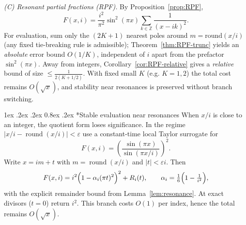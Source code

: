 \documentclass[11pt,a4paper]{amsart}
\makeatletter
\renewcommand\paragraph{\@startsection{paragraph}{4}{\z@}%
  {1ex \@plus .2ex \@minus .2ex}%
  {0.8ex \@plus .2ex}%
  {\normalfont\bfseries}}
\theoremstyle{plain}
\theoremstyle{definition}
\theoremstyle{remark}
\makeatother
\begin{document}
\smallskip
\noindent\textit{(C) Resonant partial fractions (RPF).}
By Proposition~\ref{prop:RPF},
\[
F(x,i)=\frac{i^{2}}{\pi^{2}}\sin^{2}(\pi x)\sum_{k\in\mathbb{Z}}\frac{1}{(x-ik)^{2}}.
\]
For evaluation, sum only the $(2K{+}1)$ nearest poles around $m=\mathrm{round}(x/i)$ (any fixed tie-breaking rule is admissible); Theorem~\ref{thm:RPF-trunc} yields an \emph{absolute} error bound $O(1/K)$, independent of $i$ apart from the prefactor $\sin^{2}(\pi x)$.  
Away from integers, Corollary~\ref{cor:RPF-relative} gives a \emph{relative} bound of size $\le \frac{1}{2(K+1/2)}$. With fixed small $K$ (e.g. $K=1,2$) the total cost remains $O(\sqrt{x})$, and stability near resonances is preserved without branch switching.

\paragraph*{Stable evaluation near resonances}
When $x/i$ is close to an integer, the quotient form loses significance. In the regime $\bigl|x/i-\operatorname{round}(x/i)\bigr|<\varepsilon$ use a constant-time local Taylor surrogate for 
\[
F(x,i)=\left(\frac{\sin(\pi x)}{\sin(\pi x/i)}\right)^{\!2}.
\]
Write $x=im+t$ with $m=\operatorname{round}(x/i)$ and $|t|<\varepsilon i$. Then
\[
F(x,i)=i^2\Bigl(1-\alpha_i(\pi t)^2\Bigr)^2+R_i(t),\qquad 
\alpha_i=\tfrac{1}{6}\Bigl(1-\tfrac{1}{i^2}\Bigr),
\]
with the explicit remainder bound from Lemma~\ref{lem:resonance}. At exact divisors ($t=0$) return $i^2$. This branch costs $O(1)$ per index, hence the total remains $O(\sqrt{x})$.
\end{document}
